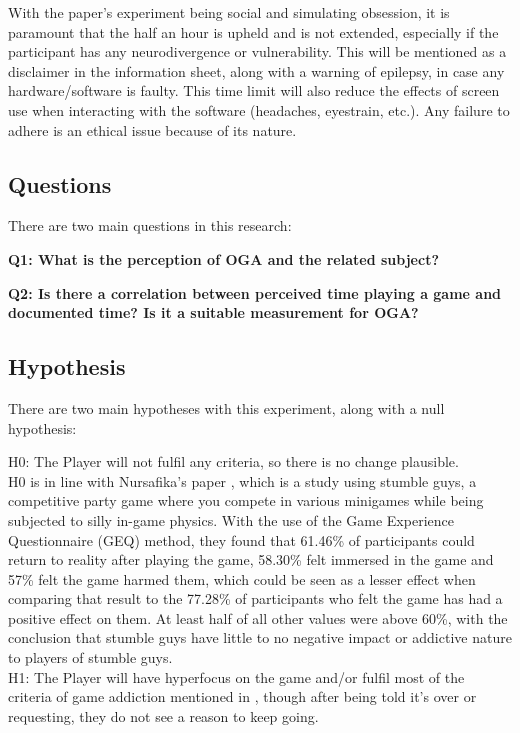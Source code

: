 \documentclass[conference]{IEEEtran}
\begin{document}
With the paper’s experiment being social and simulating obsession, it is paramount that the half an hour is upheld and is not extended, especially if the participant has any neurodivergence or vulnerability. This will be mentioned as a disclaimer in the information sheet, along with a warning of epilepsy, in case any hardware/software is faulty. This time limit will also reduce the effects of screen use when interacting with the software (headaches, eyestrain, etc.). Any failure to adhere is an ethical issue because of its nature. \\
\subsection{Questions}
There are two main questions in this research:

 \textbf{Q1: What is the perception of OGA and the related subject?}

 \textbf{Q2: Is there a correlation between perceived time playing a game and documented time? Is it a suitable measurement for OGA?}\\

\subsection{Hypothesis}
There are two main hypotheses with this experiment, along with a null hypothesis:

H0: The Player will not fulfil any criteria, so there is no change plausible.\\

H0 is in line with Nursafika's paper \cite{Nursafika2024}, which is a study using stumble guys, a competitive party game where you compete in various minigames while being subjected to silly in-game physics. With the use of the Game Experience Questionnaire (GEQ) method, they found that 61.46\% of participants could return to reality after playing the game, 58.30\% felt immersed in the game and 57\% felt the game harmed them, which could be seen as a lesser effect when comparing that result to the 77.28\% of participants who felt the game has had a positive effect on them. At least half of all other values were above 60\%,  with the conclusion that stumble guys have little to no negative impact or addictive nature to players of stumble guys.\\

H1: The Player will have hyperfocus on the game and/or fulfil most of the criteria of game addiction mentioned in \cite{NHSHamp24}, though after being told it's over or requesting, they do not see a reason to keep going.\\
\end{document}
